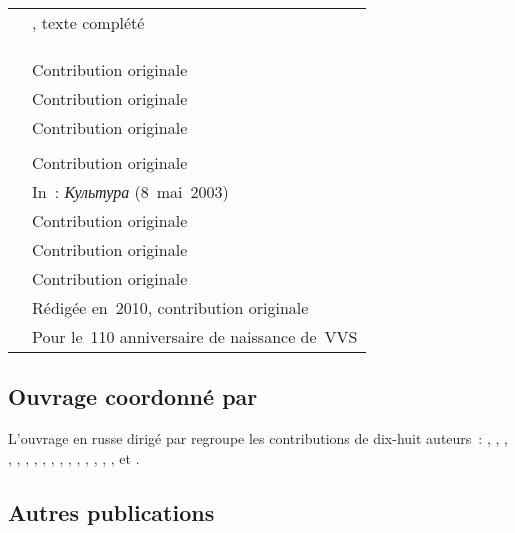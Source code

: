 \begin{table}[!htbp]
\begin{tabular}{ll}
  \citet{Alekseiev13b} & \citet[p.~449-453]{Milshteyn70}, texte complété \\
  \citet{Gornostaieva13} & \citet[p.~108-110]{Gornostaieva95} \\
  \citet{Tolstoi13} & \citet{Tolstoi95} \\
  \citet{Paperno13} & \citet[p.~69-70]{Paperno89b} \\
  \citet{Kondratiev13} & Contribution originale \\
  \citet{Muravliov13} & Contribution originale \\
  \citet{Cherkasov13} & Contribution originale \\
  \citet{Zhukov13} & \citet{Zhukov01} \\
  \citet{Ivanov13} & Contribution originale \\
  \citet{Pokrovsky13} & In~: \emph{Культура} (8~mai~2003) \\
  \citet{Savostiouk13} & Contribution originale \\
  \citet{Safonov13} & Contribution originale \\
  \citet{Vizel13a} & Contribution originale \\
  \citet{Vizel13b} & Rédigée en~2010, contribution originale \\
  \citet{Vizel13c} & Pour le~110\ieme{} anniversaire de naissance de~VVS \\
  \bottomrule
 \end{tabular}
\end{table}

\subsection{Ouvrage coordonné par \citeauthor{Lobanov03}}

L'ouvrage en russe dirigé par \citet{Lobanov03} regroupe les contributions
de dix-huit auteurs~: \citeauthor{Zolotov03a}, \citeauthor{Sofronitsky03},
\citeauthor{Lobanov03b}, \citeauthor{Sofronitskaya03},
\citeauthor{Lebedeva03}, \citeauthor{Fedorovich03}, \citeauthor{Orlovsky03},
\citeauthor{Khentova03}, \citeauthor{Tsypine03}, \citeauthor{Nikonovich03},
\citeauthor{Badeyan03b}, \citeauthor{Petropavlov03}, \citeauthor{Vizel03},
\citeauthor{Lobacheva03}, \citeauthor{Zelov03}, \citeauthor{Tompakova03a},
\citeauthor{Tompakova03b} et \citeauthor{Zolotov03b}.

\subsection{Autres publications}

